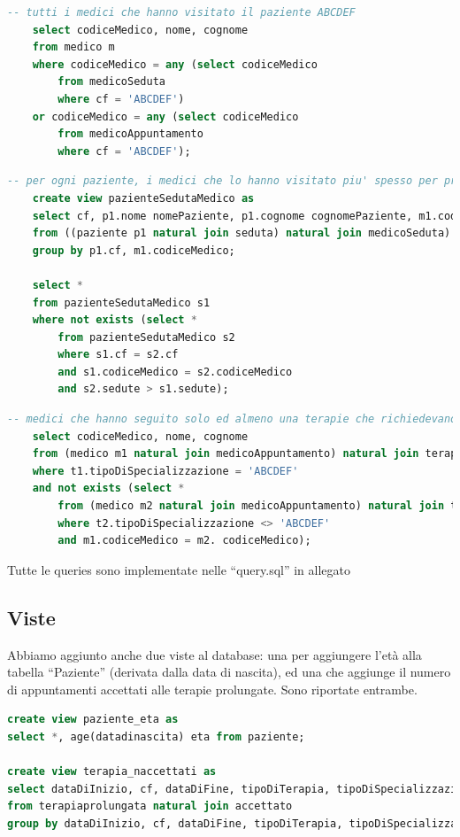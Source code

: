 \documentclass[11pt]{article}
\begin{document}
\begin{lstlisting}[language=SQL]
    -- tutti i medici che hanno visitato il paziente ABCDEF
    select codiceMedico, nome, cognome
    from medico m
    where codiceMedico = any (select codiceMedico
        from medicoSeduta
        where cf = 'ABCDEF')
    or codiceMedico = any (select codiceMedico
        from medicoAppuntamento
        where cf = 'ABCDEF');
\end{lstlisting}
\begin{lstlisting}[language=SQL]
    -- per ogni paziente, i medici che lo hanno visitato piu' spesso per problemi occasionali
    create view pazienteSedutaMedico as
    select cf, p1.nome nomePaziente, p1.cognome cognomePaziente, m1.codiceMedico codiceMedico, m1.nome nomeMedico, m1.cognome cognomeMedico, count(*) sedute
    from ((paziente p1 natural join seduta) natural join medicoSeduta) join medico m1 on medicoSeduta.codiceMedico = m1.codiceMedico
    group by p1.cf, m1.codiceMedico;
    
    select *
    from pazienteSedutaMedico s1
    where not exists (select *
        from pazienteSedutaMedico s2
        where s1.cf = s2.cf
        and s1.codiceMedico = s2.codiceMedico
        and s2.sedute > s1.sedute);
\end{lstlisting}
\begin{lstlisting}[language=SQL]
    -- medici che hanno seguito solo ed almeno una terapie che richiedevano la specializzazione ABCDEF
    select codiceMedico, nome, cognome 
    from (medico m1 natural join medicoAppuntamento) natural join terapiaProlungata t1
    where t1.tipoDiSpecializzazione = 'ABCDEF'
    and not exists (select *
        from (medico m2 natural join medicoAppuntamento) natural join terapiaProlungata t2
        where t2.tipoDiSpecializzazione <> 'ABCDEF'
        and m1.codiceMedico = m2. codiceMedico);
\end{lstlisting}
Tutte le queries sono implementate nelle ``query.sql'' in allegato

\subsection{Viste}
Abbiamo aggiunto anche due viste al database: una per aggiungere l'età alla tabella ``Paziente'' (derivata dalla data di nascita), ed una che aggiunge il numero di appuntamenti accettati alle terapie prolungate.
Sono riportate entrambe.

\begin{lstlisting}[language=SQL]
create view paziente_eta as
select *, age(datadinascita) eta from paziente;

create view terapia_naccettati as
select dataDiInizio, cf, dataDiFine, tipoDiTerapia, tipoDiSpecializzazione, count(*) nAppuntamentiAccettati
from terapiaprolungata natural join accettato
group by dataDiInizio, cf, dataDiFine, tipoDiTerapia, tipoDiSpecializzazione;
\end{lstlisting}
\end{document}

